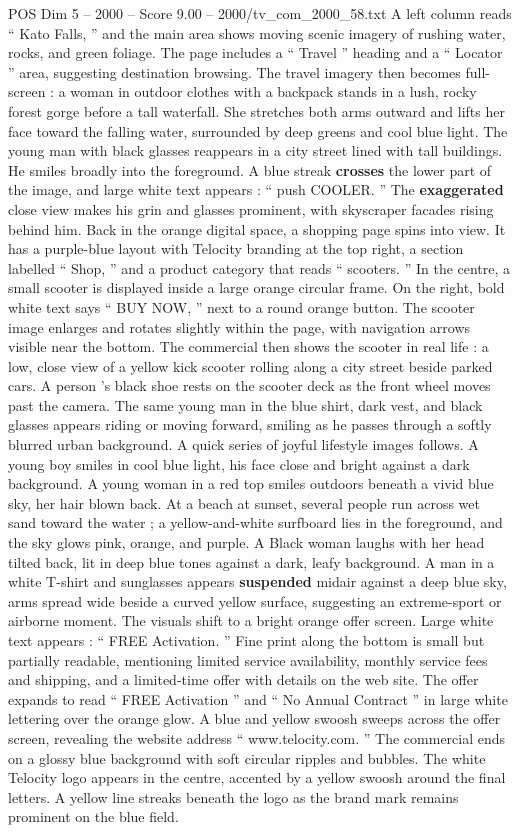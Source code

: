 \begin{textsample}{POS Dim 5 – 2000 – Score 9.00 – 2000/tv\_com\_2000\_58.txt}
A left column reads “ Kato Falls, ” and the main area shows moving scenic imagery of rushing water, rocks, and green foliage.
The page includes a “ Travel ” heading and a “ Locator ” area, suggesting destination browsing.
The travel imagery then becomes full-screen : a woman in outdoor clothes with a backpack stands in a lush, rocky forest gorge before a tall waterfall.
She stretches both arms outward and lifts her face toward the falling water, surrounded by deep greens and cool blue light.
The young man with black glasses reappears in a city street lined with tall buildings.
He smiles broadly into the foreground.
A blue streak \textbf{crosses} the lower part of the image, and large white text appears : “ push COOLER. ” The \textbf{exaggerated} close view makes his grin and glasses prominent, with skyscraper facades rising behind him.
Back in the orange digital space, a shopping page spins into view.
It has a purple-blue layout with Telocity branding at the top right, a section labelled “ Shop, ” and a product category that reads “ scooters. ” In the centre, a small scooter is displayed inside a large orange circular frame.
On the right, bold white text says “ BUY NOW, ” next to a round orange button.
The scooter image enlarges and rotates slightly within the page, with navigation arrows visible near the bottom.
The commercial then shows the scooter in real life : a low, close view of a yellow kick scooter rolling along a city street beside parked cars.
A person ’s black shoe rests on the scooter deck as the front wheel moves past the camera.
The same young man in the blue shirt, dark vest, and black glasses appears riding or moving forward, smiling as he passes through a softly blurred urban background.
A quick series of joyful lifestyle images follows.
A young boy smiles in cool blue light, his face close and bright against a dark background.
A young woman in a red top smiles outdoors beneath a vivid blue sky, her hair blown back.
At a beach at sunset, several people run across wet sand toward the water ; a yellow-and-white surfboard lies in the foreground, and the sky glows pink, orange, and purple.
A Black woman laughs with her head tilted back, lit in deep blue tones against a dark, leafy background.
A man in a white T-shirt and sunglasses appears \textbf{suspended} midair against a deep blue sky, arms spread wide beside a curved yellow surface, suggesting an extreme-sport or airborne moment.
The visuals shift to a bright orange offer screen.
Large white text appears : “ FREE Activation. ” Fine print along the bottom is small but partially readable, mentioning limited service availability, monthly service fees and shipping, and a limited-time offer with details on the web site.
The offer expands to read “ FREE Activation ” and “ No Annual Contract ” in large white lettering over the orange glow.
A blue and yellow swoosh sweeps across the offer screen, revealing the website address “ www.telocity.com. ” The commercial ends on a glossy blue background with soft circular ripples and bubbles.
The white Telocity logo appears in the centre, accented by a yellow swoosh around the final letters.
A yellow line streaks beneath the logo as the brand mark remains prominent on the blue field.


\end{textsample}
